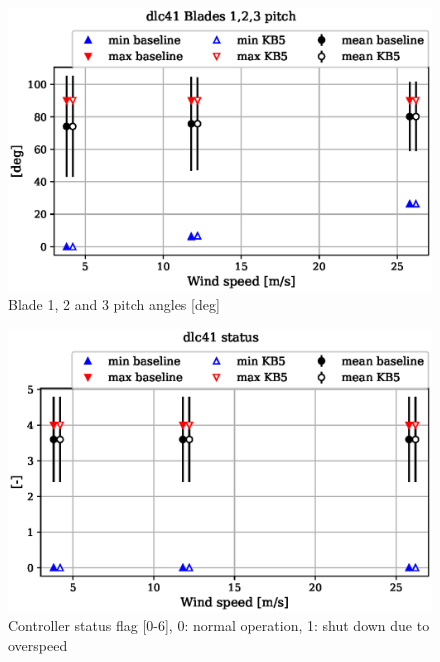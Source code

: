 \begin{figure}[!ht]
\begin{center}
	\includegraphics[width=.85\linewidth]{figures/baseline-vs-KB6/dlc41/bearing-pitch1-angle-deg_AA0008_AA0008.eps}
\end{center}
\caption{Blade 1, 2 and 3 pitch angles [deg]}
\label{fig:baseline-vs-KB6:dlc41:pitch}
\end{figure}

\begin{figure}[!ht]
\begin{center}
	\includegraphics[width=.85\linewidth]{figures/baseline-vs-KB6/dlc41/DLL-dtu_we_controller-inpvec-22_AA0008_AA0008.eps}
\end{center}
\caption{Controller status flag [0-6], 0: normal operation, 1: shut down due to overspeed}
\label{fig:baseline-vs-KB6:dlc41:status}
\end{figure}


